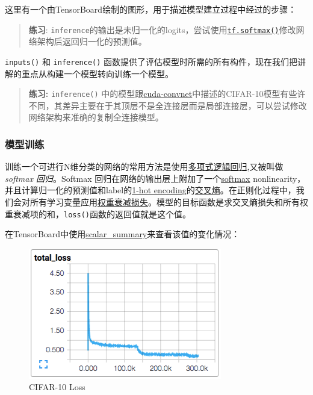这里有一个由TensorBoard绘制的图形，用于描述模型建立过程中经过的步骤：

\begin{quote}
\textbf{练习}:
\lstinline{inference}的输出是未归一化的logits，尝试使用\href{tensorflow-zh/SOURCE/api_docs/python/nn.md\#softmax}{\lstinline{tf.softmax()}}修改网络架构后返回归一化的预测值。
\end{quote}

\lstinline{inputs()} 和 \lstinline{inference()}
函数提供了评估模型时所需的所有构件，现在我们把讲解的重点从构建一个模型转向训练一个模型。

\begin{quote}
\textbf{练习:} \lstinline{inference()}
中的模型跟\href{https://code.google.com/p/cuda-convnet/}{cuda-convnet}中描述的CIFAR-10模型有些许不同，其差异主要在于其顶层不是全连接层而是局部连接层，可以尝试修改网络架构来准确的复制全连接模型。
\end{quote}

\subsubsection{模型训练}\label{ux6a21ux578bux8badux7ec3}

训练一个可进行N维分类的网络的常用方法是使用\href{https://en.wikipedia.org/wiki/Multinomial_logistic_regression}{多项式逻辑回归},又被叫做\emph{softmax
回归}。Softmax
回归在网络的输出层上附加了一个\href{https://github.com/jikexueyuanwiki/tensorflow-zh/blob/master/SOURCE/api_docs/python/nn.md\#softmax}{softmax}
nonlinearity，并且计算归一化的预测值和label的\href{https://github.com/jikexueyuanwiki/tensorflow-zh/blob/master/SOURCE/api_docs/python/sparse_ops.md\#sparse_to_dense}{1-hot
encoding}的\href{https://github.com/jikexueyuanwiki/tensorflow-zh/blob/master/SOURCE/api_docs/python/nn.md\#softmax_cross_entropy_with_logits}{交叉熵}。在正则化过程中，我们会对所有学习变量应用\href{https://github.com/jikexueyuanwiki/tensorflow-zh/blob/master/SOURCE/api_docs/python/nn.md\#l2_loss}{权重衰减损失}。模型的目标函数是求交叉熵损失和所有权重衰减项的和，\lstinline{loss()}函数的返回值就是这个值。

在TensorBoard中使用\href{https://github.com/jikexueyuanwiki/tensorflow-zh/blob/master/SOURCE/api_docs/python/train.md\#scalar_summary}{scalar\_summary}来查看该值的变化情况：

\begin{figure}[htbp]
\centering
\includegraphics{../SOURCE/images/cifar_loss.png}
\caption{CIFAR-10 Loss}
\end{figure}


